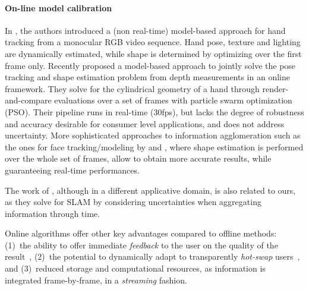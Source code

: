 \paragraph{On-line model calibration}
In \cite{delagorce2011model}, the authors introduced a (non real-time) model-based approach for hand tracking from a monocular RGB video sequence. Hand pose, texture and lighting are dynamically estimated, while shape is determined by optimizing over the first frame only.
Recently \cite{makris2015model} proposed a model-based approach to jointly solve the pose tracking and shape estimation problem from depth measurements in an online framework. They solve for the cylindrical geometry of a hand through render-and-compare evaluations over a set of frames with particle swarm optimization (PSO). Their pipeline runs in real-time (30fps), but lacks the degree of robustness and accuracy desirable for consumer level applications, and does not address uncertainty.
More sophisticated approaches to information agglomeration such as the ones for face tracking/modeling by \cite{bouaziz2013online} and \cite{li_sig13}, where shape estimation is performed over the whole set of frames, allow to obtain more accurate results, while guaranteeing real-time performances.
\begin{edit}
The work of \cite{zou2013coslam}, although in a different applicative domain, is also related to ours, as they solve for SLAM by considering uncertainties when aggregating information through time.
\end{edit}
\begin{edit}
Online algorithms offer other key advantages compared to offline methods: (1)~the ability to offer immediate \emph{feedback} to the user on the quality of the result~\cite{kinfu}, (2)~the potential to dynamically adapt to transparently \emph{hot-swap} users~\cite{bouaziz2013online}, and (3)~reduced storage and computational resources, as information is integrated frame-by-frame, in a \emph{streaming} fashion.
\end{edit}

